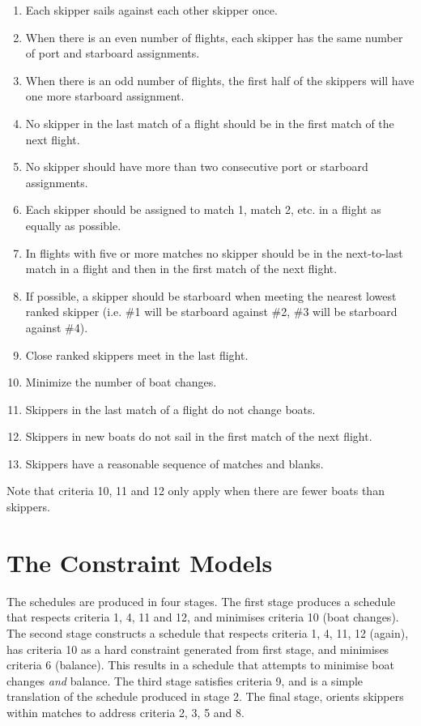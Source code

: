\documentclass{llncs}
\begin{document}
\begin{enumerate}
\item Each skipper sails against each other skipper once.
\item When there is an even number of flights, each skipper has the same number
    of port and starboard assignments.
\item When there is an odd number of flights, the first half of the skippers
    will have one more starboard assignment.
\item No skipper in the last match of a flight should be in the first match of
    the next flight.
\item No skipper should have more than two consecutive port or starboard
    assignments.
\item Each skipper should be assigned to match 1, match 2, etc. in a flight as
    equally as possible.
\item In flights with five or more matches no skipper should be in the
    next-to-last match in a flight and then in the first match of the next
    flight.
\item If possible, a skipper should be starboard when meeting the nearest
    lowest ranked skipper (i.e. \#1 will be starboard against \#2, \#3 will be
    starboard against \#4).
\item Close ranked skippers meet in the last flight.
\item Minimize the number of boat changes.
\item Skippers in the last match of a flight do not change boats.
\item Skippers in new boats do not sail in the first match of the next flight.
\item Skippers have a reasonable sequence of matches and blanks.
\end{enumerate}

Note that criteria 10, 11 and 12 only apply when there are fewer boats than
skippers.

\section{The Constraint Models}

The schedules are produced in four stages. The first stage produces a schedule
that respects criteria 1, 4, 11 and 12, and minimises criteria 10 (boat
changes). The second stage constructs a schedule that respects criteria 1, 4,
11, 12 (again), has criteria 10 as a hard constraint generated from first
stage, and minimises criteria 6 (balance). This results in a schedule that
attempts to minimise boat changes \emph{and} balance. The third stage satisfies
criteria 9, and is a simple translation of the schedule produced in stage 2.
The final stage, orients skippers within matches to address criteria 2, 3, 5
and 8.
\end{document}
